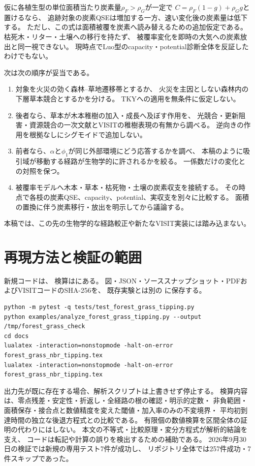 \documentclass[a4paper,11pt]{ltjsarticle}
\begin{document}
仮に各植生型の単位面積当たり炭素量$\rho_F>\rho_G$が一定で
$C=\rho_F(1-g)+\rho_Gg$と置けるなら、
追跡対象の炭素QSEは増加する一方、速い変化後の炭素量は低下する。
ただし、この式は面積被覆を炭素へ読み替えるための追加仮定である。
枯死木・リター・土壌への移行を持たず、
被覆率変化を即時の大気への炭素放出と同一視できない。
現時点でLuo型のcapacity・potential診断全体を反証したわけでもない。

次は次の順序が妥当である。
\begin{enumerate}
 \item 対象を火災の効く森林--草地遷移帯とするか、
 火災を主因としない森林内の下層草本競合とするかを分ける。
 TKYへの適用を無条件に仮定しない。
 \item 後者なら、草本が木本稚樹の加入・成長へ及ぼす作用を、
 光競合・更新阻害・資源競合の一次文献とVISITの稚樹表現の有無から調べる。
 逆向きの作用を根拠なしにシグモイドで追加しない。
 \item 前者なら、$\alpha$と$\phi_1$が同じ外部環境にどう応答するかを調べ、
 本稿のように吸引域が移動する経路が生物学的に許されるかを絞る。
 一係数だけの変化との対照を保つ。
 \item 被覆率モデルへ木本・草本・枯死物・土壌の炭素収支を接続する。
 その時点で各枝の炭素QSE、capacity、potential、実収支を別々に比較する。
 面積の置換に伴う炭素移行・放出を明示してから議論する。
\end{enumerate}
本稿では、この先の生物学的な経路較正や新たなVISIT実装には踏み込まない。

\section{再現方法と検証の範囲}
新規コードは、
検算はにある。
図・JSON・ソーススナップショット・PDFおよびVISITコードのSHA-256を、
既存実験とは別の
に保存する。
\begin{verbatim}
python -m pytest -q tests/test_forest_grass_tipping.py
python examples/analyze_forest_grass_tipping.py --output /tmp/forest_grass_check
cd docs
lualatex -interaction=nonstopmode -halt-on-error forest_grass_nbr_tipping.tex
lualatex -interaction=nonstopmode -halt-on-error forest_grass_nbr_tipping.tex
\end{verbatim}
出力先が既に存在する場合、解析スクリプトは上書きせず停止する。
検算内容は、零点残差・安定性・折返し・全経路の根の確認・明示的定数・
非負範囲・面積保存・接合点と数値精度を変えた閾値・加入率のみの不変境界・
平均初到達時間の独立な後退方程式との比較である。
有限個の数値検算を区間全体の証明の代わりにはしない。
本文の不等式・比較原理・変分方程式が解析的結論を支え、
コードは転記や計算の誤りを検出するための補助である。
2026年9月30日の検証では新規の専用テスト7件が成功し、
リポジトリ全体では257件成功・7件スキップであった。
\end{document}

